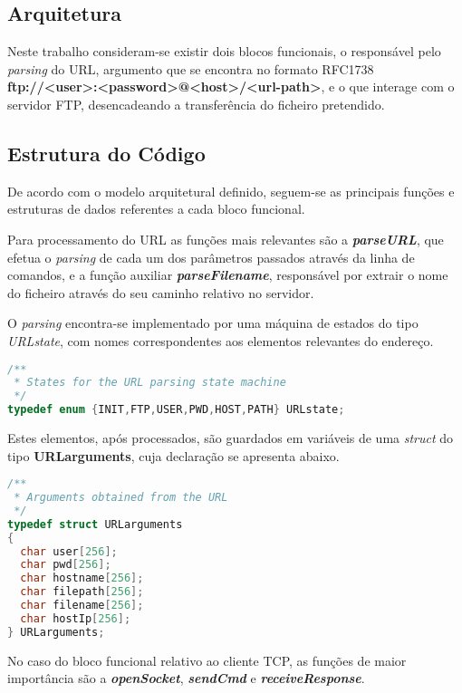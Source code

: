 \documentclass[a4paper, 11pt]{article}
\begin{document}
\subsection{Arquitetura}

Neste trabalho consideram-se existir dois blocos funcionais, o responsável pelo \textit{parsing} do URL, argumento que se encontra no formato RFC1738\\
\textbf{ftp://<user>:<password>@<host>/<url-path>}, e o que interage com o servidor FTP, desencadeando a transferência do ficheiro pretendido.

\subsection{Estrutura do Código}

De acordo com o modelo arquitetural definido, seguem-se as principais funções e estruturas de dados referentes a cada bloco funcional.\linebreak

Para processamento do URL as funções mais relevantes são a \textit{\textbf{parseURL}}, que efetua o \textit{parsing} de cada um dos parâmetros passados através da linha de comandos, e a função auxiliar \textit{\textbf{parseFilename}}, responsável por extrair o nome do ficheiro através do seu caminho relativo no servidor.

O \textit{parsing} encontra-se implementado por uma máquina de estados do tipo \textit{URLstate}, com nomes correspondentes aos elementos relevantes do endereço.

\begin{lstlisting}[language=C]
/**
 * States for the URL parsing state machine  
 */
typedef enum {INIT,FTP,USER,PWD,HOST,PATH} URLstate;
\end{lstlisting}

Estes elementos, após processados, são guardados em variáveis de uma \textit{struct} do tipo \textbf{URLarguments}, cuja declaração se apresenta abaixo.

\begin{lstlisting}[language=C]
/**
 * Arguments obtained from the URL
 */
typedef struct URLarguments
{
  char user[256];
  char pwd[256];
  char hostname[256];
  char filepath[256];
  char filename[256];
  char hostIp[256];
} URLarguments;
\end{lstlisting}

No caso do bloco funcional relativo ao cliente TCP, as funções de maior importância são a \textit{\textbf{openSocket}}, \textit{\textbf{sendCmd}} e \textit{\textbf{receiveResponse}}.
\end{document}
